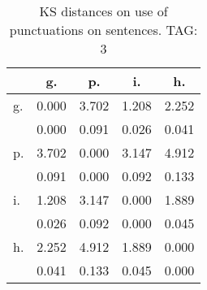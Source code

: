 \begin{table}[h!]
\begin{center}
\begin{tabular}{| l | c | c | c | c |}\hline
 & g. & p. & i. & h. \\\hline
g. & 0.000  & 3.702  & 1.208  & 2.252 \\\hline
 & 0.000  & 0.091  & 0.026  & 0.041 \\\hline
p. & 3.702  & 0.000  & 3.147  & 4.912 \\\hline
 & 0.091  & 0.000  & 0.092  & 0.133 \\\hline
i. & 1.208  & 3.147  & 0.000  & 1.889 \\\hline
 & 0.026  & 0.092  & 0.000  & 0.045 \\\hline
h. & 2.252  & 4.912  & 1.889  & 0.000 \\\hline
 & 0.041  & 0.133  & 0.045  & 0.000 \\\hline
\end{tabular}
\caption{KS distances on use of punctuations on sentences. TAG: 3}
\end{center}
\end{table}